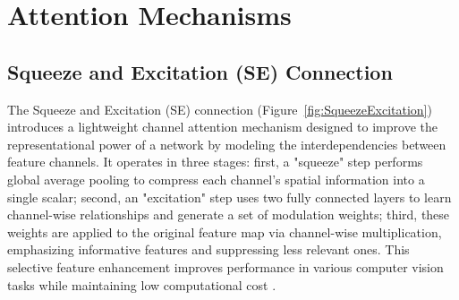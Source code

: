 





\section*{Attention Mechanisms}

\subsection*{Squeeze and Excitation (SE) Connection}
The Squeeze and Excitation (SE) connection (Figure~\ref{fig:SqueezeExcitation}) introduces a lightweight channel attention mechanism designed to improve the representational power of a network by modeling the interdependencies between feature channels. It operates in three stages: first, a "squeeze" step performs global average pooling to compress each channel’s spatial information into a single scalar; second, an "excitation" step uses two fully connected layers to learn channel-wise relationships and generate a set of modulation weights; third, these weights are applied to the original feature map via channel-wise multiplication, emphasizing informative features and suppressing less relevant ones. This selective feature enhancement improves performance in various computer vision tasks while maintaining low computational cost \parencite{dobko2020cnn}.

